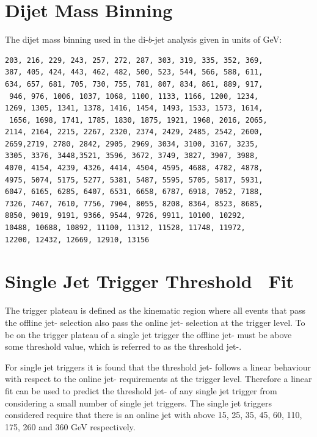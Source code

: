
\appendix

\clearpage
{}
{}
\chapter{Dijet Mass Binning}
\label{app:dijet_bins}

\noindent
The dijet mass binning used in the di-$b$-jet analysis given in units of GeV:
\begin{verbatim}
203, 216, 229, 243, 257, 272, 287, 303, 319, 335, 352, 369,
387, 405, 424, 443, 462, 482, 500, 523, 544, 566, 588, 611, 
634, 657, 681, 705, 730, 755, 781, 807, 834, 861, 889, 917,
 946, 976, 1006, 1037, 1068, 1100, 1133, 1166, 1200, 1234, 
1269, 1305, 1341, 1378, 1416, 1454, 1493, 1533, 1573, 1614,
 1656, 1698, 1741, 1785, 1830, 1875, 1921, 1968, 2016, 2065, 
2114, 2164, 2215, 2267, 2320, 2374, 2429, 2485, 2542, 2600, 
2659,2719, 2780, 2842, 2905, 2969, 3034, 3100, 3167, 3235, 
3305, 3376, 3448,3521, 3596, 3672, 3749, 3827, 3907, 3988, 
4070, 4154, 4239, 4326, 4414, 4504, 4595, 4688, 4782, 4878, 
4975, 5074, 5175, 5277, 5381, 5487, 5595, 5705, 5817, 5931, 
6047, 6165, 6285, 6407, 6531, 6658, 6787, 6918, 7052, 7188, 
7326, 7467, 7610, 7756, 7904, 8055, 8208, 8364, 8523, 8685, 
8850, 9019, 9191, 9366, 9544, 9726, 9911, 10100, 10292, 
10488, 10688, 10892, 11100, 11312, 11528, 11748, 11972, 
12200, 12432, 12669, 12910, 13156
\end{verbatim}


\chapter{Single Jet Trigger Threshold~\pT{} Fit}
\label{app:triggerTurnOn_fit}

The trigger plateau is defined as the kinematic region where all events that pass the offline jet-\pT{} selection
also pass the online jet-\pT{} selection at the trigger level.
To be on the trigger plateau of a single jet trigger
the offline jet-\pT{} must be above some threshold value,
which is referred to as the threshold jet-\pT{}.

For single jet triggers it is found that the threshold jet-\pT{} follows
a linear behaviour with respect to the online jet-\pT{} requirements at the trigger level.
Therefore a linear fit can be used to predict the threshold jet-\pT{} of any single jet trigger
from considering a small number of single jet triggers.
The single jet triggers considered require that there is an online jet with \pT{} above
15, 25, 35, 45, 60, 110, 175, 260 and 360 GeV respectively.

